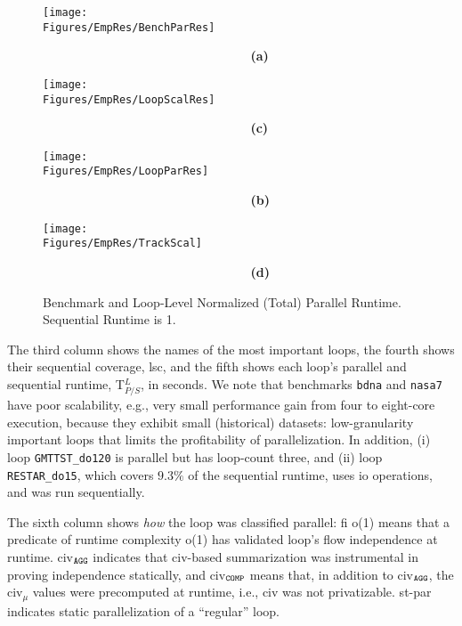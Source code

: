 \documentclass[10pt,nocopyrightspace]{sigplanconf}
\newcommand{\Figures}[1]{../Figures/}
\begin{document}
\begin{figure*}[t] 
\begin{minipage}{1.2\columnwidth}
    \texttt{[image: \\Figures/EmpRes/BenchParRes]} 

      {\bf~~~~~~~~~~~~~~~~~~~~~~~~~~~~~(a)} \vspace{2ex}

    \texttt{[image: \\Figures/EmpRes/LoopScalRes]}
      
      {\bf~~~~~~~~~~~~~~~~~~~~~~~~~~~~~(c)}\vspace{1ex}

\end{minipage}
\begin{minipage}{0.9\columnwidth}
    \texttt{[image: \\Figures/EmpRes/LoopParRes]} 

      {\bf~~~~~~~~~~~~~~~~~~~~~~~~~~~~~(b)}\vspace{2ex}

   \texttt{[image: \\Figures/EmpRes/TrackScal]}
      
      {\bf~~~~~~~~~~~~~~~~~~~~~~~~~~~~~(d)}\vspace{1ex}

\end{minipage}
\caption{ Benchmark and Loop-Level Normalized (Total) Parallel Runtime. Sequential Runtime is 1.}
\label{fig:ParRuntime} %
\end{figure*}


The third column shows the names of the most important loops,
the fourth shows their sequential coverage, {\sc lsc}, and the
fifth shows each loop's parallel and sequential runtime, T$_{P/S}^L$, in seconds.
%
We note that benchmarks {\tt bdna} and {\tt nasa7} have poor scalability, e.g., very small
performance gain from four to eight-core execution, because they exhibit
small (historical) datasets: low-granularity important loops that limits the 
profitability of parallelization.
In addition, (i) loop {\tt GMTTST\_do120} 
is parallel but has loop-count three, and (ii) loop {\tt RESTAR\_do15},
which covers $9.3\%$ of the sequential runtime, uses {\sc io} operations,
and was run sequentially. 

The sixth column shows {\em how} the loop was classified parallel: {\sc fi} {\sc o(1)}
means that a predicate of runtime complexity {\sc o(1)} has validated loop's flow
independence at runtime. {\sc civ}$_{\tt{}AGG}$ indicates that {\sc civ}-based summarization 
was instrumental in proving independence statically, and {\sc civ}$_{\tt{}COMP}$ means that,
in addition to {\sc civ}$_{\tt{}AGG}$, the {\sc civ}$_\mu$ values were precomputed
at runtime, i.e., {\sc civ} was not privatizable.  {\sc st-par} indicates static
parallelization of a ``regular'' loop. 
\end{document}
